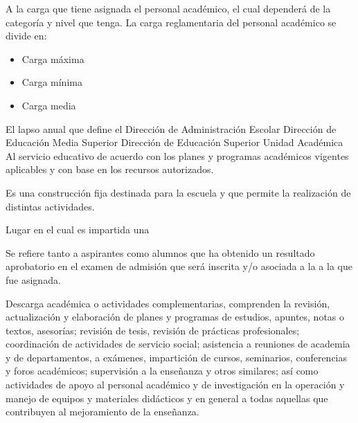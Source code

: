 \begin{bGlosario}
	  A la carga que tiene asignada el personal académico, el cual  dependerá de la categoría y nivel que tenga. La carga reglamentaria del personal académico se divide en: 
	 	\begin{itemize}
	 		\item Carga máxima
	 		\item Carga mínima
	 		\item Carga media
	 	\end{itemize}
	  El lapso anual que define el 
	  Dirección de Administración Escolar
	  Dirección de Educación Media Superior
	  Dirección de Educación Superior
	  Unidad Académica
	  Al servicio educativo de acuerdo con los planes y programas académicos vigentes aplicables y con base en los recursos autorizados.
 
	 Es una construcción fija destinada para la escuela y que permite la realización de distintas actividades.
	
	 Lugar en el cual es impartida una 
	
	 Se refiere tanto a aspirantes como alumnos que ha obtenido un resultado aprobatorio en el examen de admisión que será inscrita y/o asociada a la  a la que fue asignada.

 	 Descarga académica o actividades complementarias, comprenden la revisión, actualización y elaboración de planes y programas de estudios, apuntes, notas o textos, asesorías; revisión de tesis, revisión de prácticas profesionales; coordinación de actividades de servicio social; asistencia a reuniones de academia y de departamentos, a exámenes, impartición de cursos, seminarios, conferencias y foros académicos; supervisión a la enseñanza y otros similares; así como actividades de apoyo al personal académico y de investigación en la operación y manejo de equipos y materiales didácticos y en general a todas aquellas que contribuyen al mejoramiento
 	de la enseñanza.
 	

\end{bGlosario}
